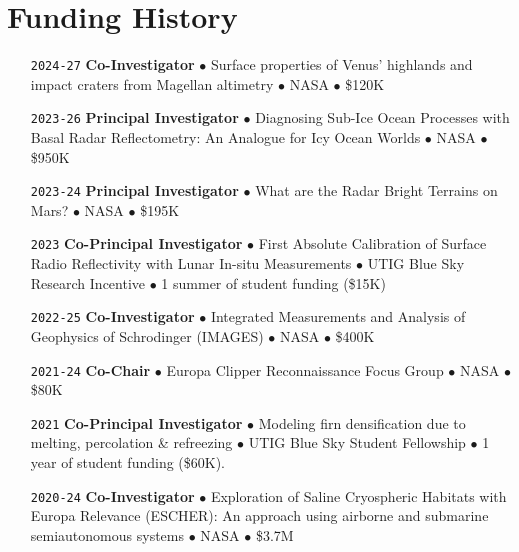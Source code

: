 \section*{Funding History}

\begin{itemize}[leftmargin=5.8em, labelsep=1.5em]
    \setlength\itemsep{-.3em}
    
    \item[\texttt{2024-27}] \textbf{Co-Investigator} $\bullet$ Surface properties of Venus’ highlands and impact craters from Magellan altimetry $\bullet$ NASA $\bullet$ \$120K
    
    \item[\texttt{2023-26}] \textbf{Principal Investigator} $\bullet$ Diagnosing Sub-Ice Ocean Processes with Basal Radar Reflectometry: An Analogue for Icy Ocean Worlds $\bullet$ NASA $\bullet$ \$950K

    \item[\texttt{2023-24}] \textbf{Principal Investigator} $\bullet$ What are the Radar Bright Terrains on Mars? $\bullet$ NASA $\bullet$ \$195K
    
    \item[\texttt{2023}] \textbf{Co-Principal Investigator} $\bullet$ First Absolute Calibration of Surface Radio Reflectivity with Lunar In-situ Measurements $\bullet$ UTIG Blue Sky Research Incentive $\bullet$ 1 summer of student funding (\$15K)
    
    \item[\texttt{2022-25}] \textbf{Co-Investigator} $\bullet$ Integrated Measurements and Analysis of Geophysics of Schrodinger (IMAGES) $\bullet$ NASA $\bullet$ \$400K
    
    \item[\texttt{2021-24}] \textbf{Co-Chair} $\bullet$ Europa Clipper Reconnaissance Focus Group $\bullet$ NASA $\bullet$ \$80K
    
    \item[\texttt{2021}] \textbf{Co-Principal Investigator} $\bullet$ Modeling firn densification due to melting, percolation \& refreezing $\bullet$ UTIG Blue Sky Student Fellowship $\bullet$ 1 year of student funding (\$60K).
    
    \item[\texttt{2020-24}] \textbf{Co-Investigator} $\bullet$ Exploration of Saline Cryospheric Habitats with Europa Relevance (ESCHER): An approach using airborne and submarine semiautonomous systems $\bullet$ NASA $\bullet$ \$3.7M
    

\end{itemize}
